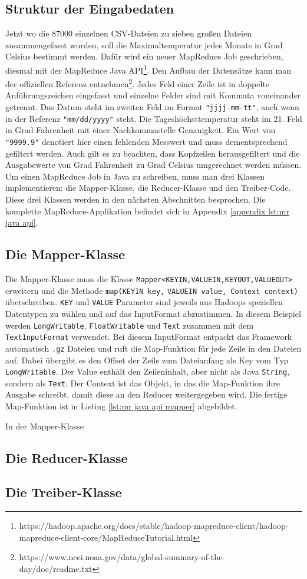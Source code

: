 \subsection{Struktur der Eingabedaten}
Jetzt wo die 87000 einzelnen CSV-Dateien zu sieben großen Dateien zusammengefasst wurden, soll die Maximaltemperatur jedes Monats in Grad Celsius bestimmt werden. Dafür wird ein neuer MapReduce Job geschrieben, diesmal mit der MapReduce Java API\footnote{https://hadoop.apache.org/docs/stable/hadoop-mapreduce-client/hadoop-mapreduce-client-core/MapReduceTutorial.html}. Den Aufbau der Datensätze kann man der offiziellen Referenz entnehmen\footnote{https://www.ncei.noaa.gov/data/global-summary-of-the-day/doc/readme.txt}. Jedes Feld einer Zeile ist in doppelte Anführungszeichen eingefasst und einzelne Felder sind mit Kommata voneinander getrennt. Das Datum steht im zweiten Feld im Format \verb|"jjjj-mm-tt"|, auch wenn in der Referenz \verb|"mm/dd/yyyy"| steht. Die Tageshöchsttemperatur steht im 21. Feld in Grad Fahrenheit mit einer Nachkommastelle Genauigkeit. Ein Wert von \verb|"9999.9"| denotiert hier einen fehlenden Messwert und muss dementsprechend gefiltert werden. Auch gilt es zu beachten, dass Kopfzeilen herausgefiltert und die Ausgabewerte von Grad Fahrenheit zu Grad Celsius umgerechnet werden müssen.
Um einen MapReduce Job in Java zu schreiben, muss man drei Klassen implementieren: die Mapper-Klasse, die Reducer-Klasse und den Treiber-Code. Diese drei Klassen werden in den nächsten Abschnitten besprochen. Die komplette MapReduce-Applikation befindet sich in Appendix \ref{appendix lst:mr java api}.

\subsection{Die Mapper-Klasse}
Die Mapper-Klasse muss die Klasse \verb|Mapper<KEYIN,VALUEIN,KEYOUT,VALUEOUT>| erweitern und die Methode \verb|map(KEYIN key,| \verb|VALUEIN value, Context context)| überschreiben. \verb|KEY| und \verb|VALUE| Parameter sind jeweils aus Hadoops speziellen Datentypen zu wählen und auf das InputFormat abzustimmen. In diesem Beispiel werden \verb|LongWritable|, \verb|FloatWritable| und \verb|Text| zusammen mit dem \verb|TextInputFormat| verwendet. Bei diesem InputFormat entpackt das Framework automatisch \verb|.gz| Dateien und ruft die Map-Funktion für jede Zeile in den Dateien auf. Dabei übergibt es den Offset der Zeile zum Dateianfang als Key vom Typ \verb|LongWritable|. Der Value enthält den Zeileninhalt, aber nicht als Java \verb|String|, sondern als \verb|Text|. Der Context ist das Objekt, in das die Map-Funktion ihre Ausgabe schreibt, damit diese an den Reducer weitergegeben wird. Die fertige Map-Funktion ist in Listing \ref{lst:mr java api mapper} abgebildet.



In der Mapper-Klasse  


\subsection{Die Reducer-Klasse}

\subsection{Die Treiber-Klasse}


